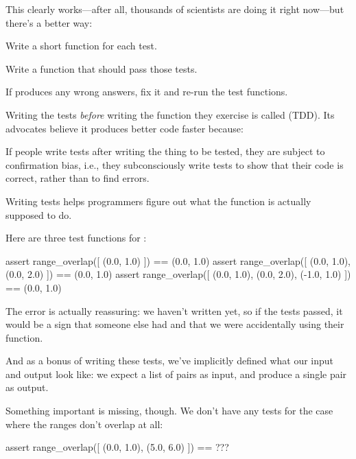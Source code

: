 This clearly works---after all, thousands of scientists are doing it
right now---but there's a better way:

\begin{swcenumerate}
\item
  Write a short function for each test.
\item
  Write a  function that should pass those tests.
\item
  If  produces any wrong answers, fix it and
  re-run the test functions.
\end{swcenumerate}

Writing the tests \emph{before} writing the function they exercise is
called 
(TDD). Its advocates believe it produces better code faster because:

\begin{swcenumerate}
\item
  If people write tests after writing the thing to be tested, they are
  subject to confirmation bias, i.e., they subconsciously write tests to
  show that their code is correct, rather than to find errors.
\item
  Writing tests helps programmers figure out what the function is
  actually supposed to do.
\end{swcenumerate}

Here are three test functions for :

\begin{VerbIn}
assert range_overlap([ (0.0, 1.0) ]) == (0.0, 1.0)
assert range_overlap([ (0.0, 1.0), (0.0, 2.0) ]) == (0.0, 1.0)
assert range_overlap([ (0.0, 1.0), (0.0, 2.0), (-1.0, 1.0) ]) == (0.0, 1.0)
\end{VerbIn}

The error is actually reassuring: we haven't written
 yet, so if the tests passed, it would be a sign
that someone else had and that we were accidentally using their
function.

And as a bonus of writing these tests, we've implicitly defined what our
input and output look like: we expect a list of pairs as input, and
produce a single pair as output.

Something important is missing, though. We don't have any tests for the
case where the ranges don't overlap at all:

\begin{VerbIn}
assert range_overlap([ (0.0, 1.0), (5.0, 6.0) ]) == ???
\end{VerbIn}

